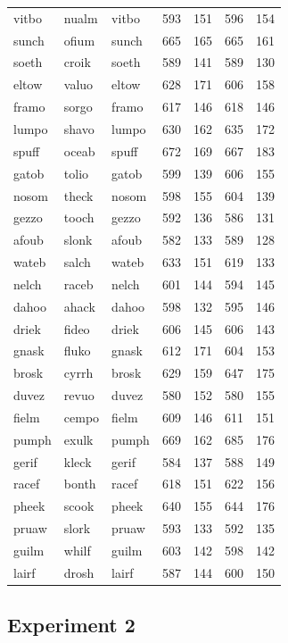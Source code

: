 \documentclass[
]{interact}
\begin{document}
\begin{table}
\begin{tabular*}{\linewidth}{@{\extracolsep{\fill}}lllrrrr}
vitbo & nualm & vitbo & 593 & 151 & 596 & 154 \\ 
sunch & ofium & sunch & 665 & 165 & 665 & 161 \\ 
soeth & croik & soeth & 589 & 141 & 589 & 130 \\ 
eltow & valuo & eltow & 628 & 171 & 606 & 158 \\ 
framo & sorgo & framo & 617 & 146 & 618 & 146 \\ 
lumpo & shavo & lumpo & 630 & 162 & 635 & 172 \\ 
spuff & oceab & spuff & 672 & 169 & 667 & 183 \\ 
gatob & tolio & gatob & 599 & 139 & 606 & 155 \\ 
nosom & theck & nosom & 598 & 155 & 604 & 139 \\ 
gezzo & tooch & gezzo & 592 & 136 & 586 & 131 \\ 
afoub & slonk & afoub & 582 & 133 & 589 & 128 \\ 
wateb & salch & wateb & 633 & 151 & 619 & 133 \\ 
nelch & raceb & nelch & 601 & 144 & 594 & 145 \\ 
dahoo & ahack & dahoo & 598 & 132 & 595 & 146 \\ 
driek & fideo & driek & 606 & 145 & 606 & 143 \\ 
gnask & fluko & gnask & 612 & 171 & 604 & 153 \\ 
brosk & cyrrh & brosk & 629 & 159 & 647 & 175 \\ 
duvez & revuo & duvez & 580 & 152 & 580 & 155 \\ 
fielm & cempo & fielm & 609 & 146 & 611 & 151 \\ 
pumph & exulk & pumph & 669 & 162 & 685 & 176 \\ 
gerif & kleck & gerif & 584 & 137 & 588 & 149 \\ 
racef & bonth & racef & 618 & 151 & 622 & 156 \\ 
pheek & scook & pheek & 640 & 155 & 644 & 176 \\ 
pruaw & slork & pruaw & 593 & 133 & 592 & 135 \\ 
guilm & whilf & guilm & 603 & 142 & 598 & 142 \\ 
lairf & drosh & lairf & 587 & 144 & 600 & 150 \\ 
\bottomrule
\end{tabular*}
\end{table}

\subsection*{Experiment 2}\label{experiment-2}
\end{document}
